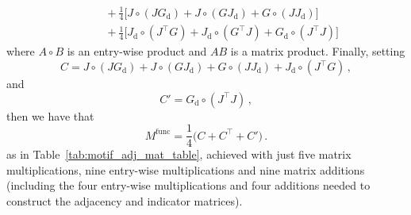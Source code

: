 \begin{example}
\begin{align*}
& \qquad + \frac{1}{4} \Big[ J \circ (J G_\mathrm{d}) + J \circ (G J_\mathrm{d}) + G \circ (J J_\mathrm{d}) \Big] \\
& \qquad + \frac{1}{4} \Big[ J_\mathrm{d} \circ (J^\top G) + J_\mathrm{d} \circ (G^\top J) + G_\mathrm{d} \circ (J^\top J) \Big]
\end{align*}
%
where $A \circ B$ is an entry-wise product and $AB$ is a matrix product. Finally, setting
$$C = J \circ (J G_\mathrm{d}) + J \circ (G J_\mathrm{d}) + G \circ (J J_\mathrm{d}) + J_\mathrm{d} \circ (J^\top G)\,, $$
and
$$ C' = G_\mathrm{d} \circ (J^\top J)\,, $$
then we have that
$$ M^\mathrm{func} = \frac{1}{4} \big(C + C^\top + C' \big)\,. $$
as in Table~\ref{tab:motif_adj_mat_table}, achieved with just five matrix multiplications, nine entry-wise multiplications and nine matrix additions (including the four entry-wise multiplications and four additions needed to construct the adjacency and indicator matrices).
\end{example}